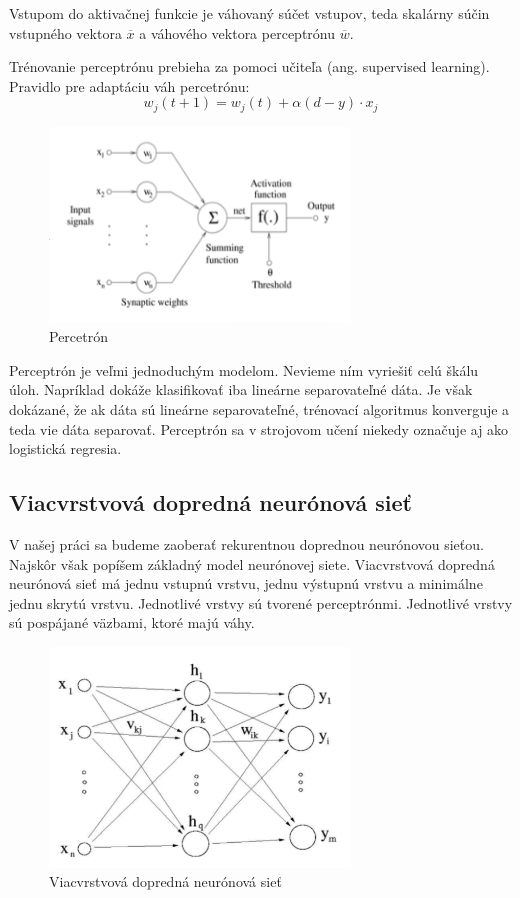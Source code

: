 Vstupom do aktivačnej funkcie je váhovaný súčet vstupov, teda skalárny súčin vstupného vektora $\overline{x}$ a 
váhového vektora perceptrónu $\overline{w}$.


Trénovanie perceptrónu prebieha za pomoci učiteľa (ang. supervised learning).
Pravidlo pre adaptáciu váh percetrónu:
\begin{equation}
	w_j(t+1) = w_j(t) + \alpha (d - y)\cdot x_j
\end{equation}


\begin{figure}[H]
	\centering
	\includegraphics[width=8cm]{assets/perceptron}
	\caption{Percetrón}
\end{figure}

Perceptrón je veľmi jednoduchým modelom. 
Nevieme ním vyriešiť celú škálu úloh. Napríklad dokáže klasifikovať 
iba lineárne separovateľné dáta. Je však dokázané, že ak dáta sú lineárne separovateľné, trénovací algoritmus
konverguje a teda vie dáta separovať.
Perceptrón sa v strojovom učení niekedy označuje aj ako logistická regresia.

\subsection{Viacvrstvová dopredná neurónová sieť}
V našej práci sa budeme zaoberať rekurentnou doprednou neurónovou sieťou. Najskôr však popíšem základný model
neurónovej siete. 
Viacvrstvová dopredná neurónová sieť má jednu vstupnú vrstvu, jednu výstupnú vrstvu a minimálne jednu skrytú vrstvu. 
Jednotlivé vrstvy sú tvorené perceptrónmi. Jednotlivé vrstvy sú pospájané väzbami, ktoré majú váhy.

\begin{figure}[H]
	\centering
	\includegraphics[width=8cm]{assets/mlp}
	\caption{Viacvrstvová dopredná neurónová sieť}
\end{figure}

